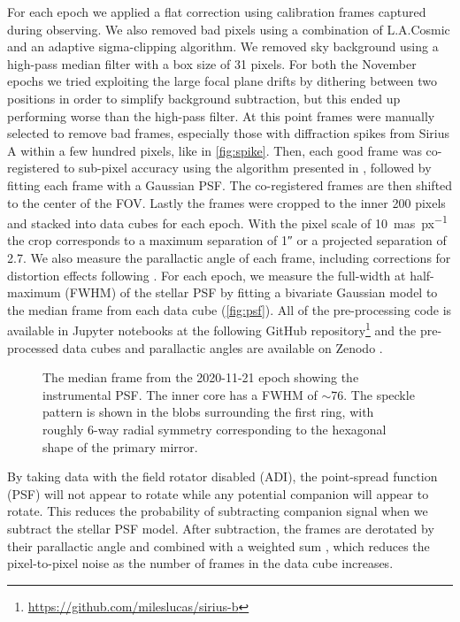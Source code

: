 \documentclass[twocolumn]{aastex631}
\begin{document}
For each epoch we applied a flat correction using calibration frames captured during observing. We also removed bad pixels using a combination of L.A.Cosmic \citep{van_dokkum_cosmic-ray_2001} and an adaptive sigma-clipping algorithm. We removed sky background using a high-pass median filter with a box size of 31 pixels. For both the November epochs we tried exploiting the large focal plane drifts by dithering between two positions in order to simplify background subtraction, but this ended up performing worse than the high-pass filter. At this point frames were manually selected to remove bad frames, especially those with diffraction spikes from Sirius A within a few hundred pixels, like in \autoref{fig:spike}. Then, each good frame was co-registered to sub-pixel accuracy using the algorithm presented in \citet{guizar-sicairos_efficient_2008}, followed by fitting each frame with a Gaussian PSF. The co-registered frames are then shifted to the center of the FOV. Lastly the frames were cropped to the inner 200 pixels and stacked into data cubes for each epoch. With the pixel scale of \qty{10}{mas\per px} the crop corresponds to a maximum separation of \ang{;;1} or a projected separation of \qty{2.7}{\au}. We also measure the parallactic angle of each frame, including corrections for distortion effects following \cite{yelda_improving_2010}. For each epoch, we measure the full-width at half-maximum (FWHM) of the stellar PSF by fitting a bivariate Gaussian model to the median frame from each data cube (\autoref{fig:psf}). All of the pre-processing code is available in Jupyter notebooks at the following GitHub repository\footnote{\href{https://github.com/mileslucas/sirius-b}{https://github.com/mileslucas/sirius-b}} and the pre-processed data cubes and parallactic angles are available on Zenodo \citep{lucas_nirc2_2021}.

\begin{figure}
    \centering
    \caption{The median frame from the 2020-11-21 epoch showing the instrumental PSF. The inner core has a FWHM of $\sim$\qty{76}{\milliarcsecond}. The speckle pattern is shown in the blobs surrounding the first ring, with roughly 6-way radial symmetry corresponding to the hexagonal shape of the primary mirror.}
    \label{fig:psf}
\end{figure}

By taking data with the field rotator disabled (ADI), the point-spread function (PSF) will not appear to rotate while any potential companion will appear to rotate. This reduces the probability of subtracting companion signal when we subtract the stellar PSF model. After subtraction, the frames are derotated by their parallactic angle and combined with a weighted sum \citep{bottom_noise-weighted_2017}, which reduces the pixel-to-pixel noise as the number of frames in the data cube increases.
\end{document}
